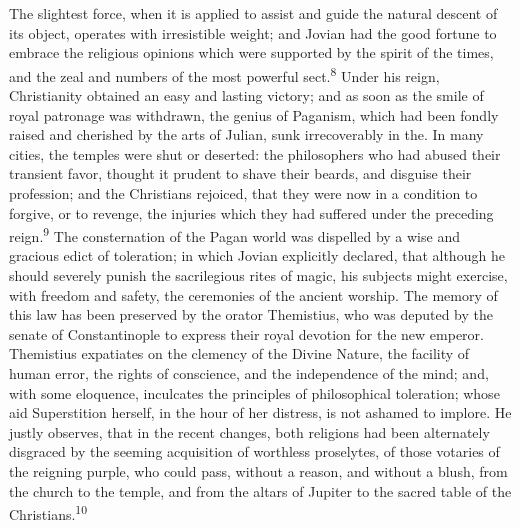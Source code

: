


The slightest force, when it is applied to assist and guide the
natural descent of its object, operates with irresistible weight;
and Jovian had the good fortune to embrace the religious opinions
which were supported by the spirit of the times, and the zeal and
numbers of the most powerful sect.\textsuperscript{8} Under his reign,
Christianity obtained an easy and lasting victory; and as soon as
the smile of royal patronage was withdrawn, the genius of
Paganism, which had been fondly raised and cherished by the arts
of Julian, sunk irrecoverably in the. In many cities, the temples
were shut or deserted: the philosophers who had abused their
transient favor, thought it prudent to shave their beards, and
disguise their profession; and the Christians rejoiced, that they
were now in a condition to forgive, or to revenge, the injuries
which they had suffered under the preceding reign.\textsuperscript{9} The
consternation of the Pagan world was dispelled by a wise and
gracious edict of toleration; in which Jovian explicitly
declared, that although he should severely punish the
sacrilegious rites of magic, his subjects might exercise, with
freedom and safety, the ceremonies of the ancient worship. The
memory of this law has been preserved by the orator Themistius,
who was deputed by the senate of Constantinople to express their
royal devotion for the new emperor. Themistius expatiates on the
clemency of the Divine Nature, the facility of human error, the
rights of conscience, and the independence of the mind; and, with
some eloquence, inculcates the principles of philosophical
toleration; whose aid Superstition herself, in the hour of her
distress, is not ashamed to implore. He justly observes, that in
the recent changes, both religions had been alternately disgraced
by the seeming acquisition of worthless proselytes, of those
votaries of the reigning purple, who could pass, without a
reason, and without a blush, from the church to the temple, and
from the altars of Jupiter to the sacred table of the Christians.\textsuperscript{10}

